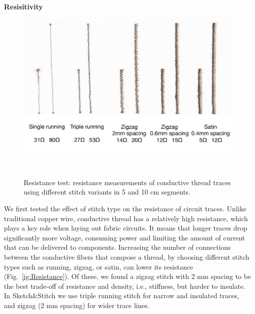 \documentclass[header.tex]{subfiles}
\begin{document}
\paragraph{Resisitivity}
 \begin{figure}
\centering
  \includegraphics[width=1\columnwidth]{figures/Resistance}
  \caption{Resistance test: resistance measurements of conductive thread traces using different stitch variants in 5 and 10 cm segments.}~\label{fig:Resistance}
  \vspace{-0.5em}
\end{figure}
We first tested the effect of stitch type on the resistance of circuit traces. Unlike traditional copper wire, conductive thread has a relatively high resistance, which plays a key role when laying out fabric circuits. It means that longer traces drop significantly more voltage, consuming power and limiting the amount of current that can be delivered to components. Increasing the number of connections between the conductive fibers that compose a thread, by choosing different stitch types such as running, zigzag, or satin, can lower its resistance (Fig.\  \ref{ig:Resistance}). Of these, we found a zigzag stitch with 2 mm spacing to be the best trade-off of resistance and density, i.e., stiffness, but harder to insulate. In Sketch\&Stitch we use triple running stitch for narrow and insulated traces, and zigzag (2 mm spacing) for wider trace lines. 
\end{document}
